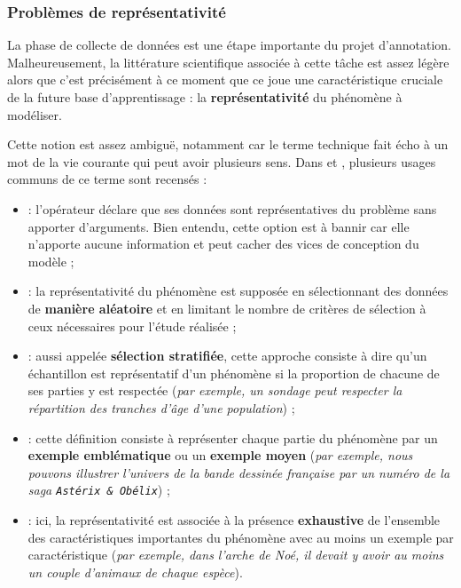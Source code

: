 		
		\subsubsection{Problèmes de représentativité}
		\label{section:2.3.1.A-DEFIS-ANNOTATION-ASPECT-DONNEES-REPRESENTATIVITE}
			
			La phase de collecte de données est une étape importante du projet d'annotation.
			Malheureusement, la littérature scientifique associée à cette tâche est assez légère alors que c'est précisément à ce moment que ce joue une caractéristique cruciale de la future base d'apprentissage : la \textbf{représentativité} du phénomène à modéliser.
			
			Cette notion est assez ambiguë, notamment car le terme technique fait écho à un mot de la vie courante qui peut avoir plusieurs sens.
			Dans \cite{kruskal-mosteller:1979:representative-sampling-nonscientific} et \cite{clemmensen-kjaersgaard:2022:data-representativity-machine}, plusieurs usages communs de ce terme sont recensés :
			\begin{itemize}
				\item {} :
				l'opérateur déclare que ses données sont représentatives du problème sans apporter d'arguments. Bien entendu, cette option est à bannir car elle n'apporte aucune information et peut cacher des vices de conception du modèle ;
				\item {} :
				la représentativité du phénomène est supposée en sélectionnant des données de \textbf{manière aléatoire} et en limitant le nombre de critères de sélection à ceux nécessaires pour l'étude réalisée ; 
				\item {} :
				aussi appelée \textbf{sélection stratifiée}, cette approche consiste à dire qu'un échantillon est représentatif d'un phénomène si la proportion de chacune de ses parties y est respectée
				(\textit{par exemple, un sondage peut respecter la répartition des tranches d'âge d'une population}) ;
				\item {} :
				cette définition consiste à représenter chaque partie du phénomène par un \textbf{exemple emblématique} ou un \textbf{exemple moyen}
				(\textit{par exemple, nous pouvons illustrer l'univers de la bande dessinée française par un numéro de la saga \texttt{Astérix \& Obélix}}) ;
				\item {} :
				ici, la représentativité est associée à la présence \textbf{exhaustive} de l'ensemble des caractéristiques importantes du phénomène avec au moins un exemple par caractéristique
				(\textit{par exemple, dans l'arche de Noé, il devait y avoir au moins un couple d'animaux de chaque espèce}).
			\end{itemize}
			
